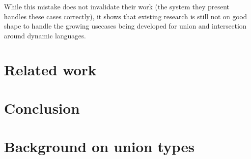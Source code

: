 \documentclass[sigplan,10pt,review,anonymous]{acmart}
\newcommand{\unsure}[2][1=]{}
\newcommand{\info}[2][1=]{}
\begin{document}

While this mistake does not invalidate their work (the system they present
handles these cases correctly), it shows that existing research is still not on
good shape to handle the growing usecases being developed for
union and intersection around dynamic languages.





\unsure{Is it worth mentioning how continuations are formed?
Should we go so techincal?}

\newpage

\section{Related work}
\info{Including a mention of statically typed systems with union}
\info{Include something about Racket's and and or contracts}

\newpage

\section{Conclusion}



\appendix


\section{Background on union types}
\end{document}
